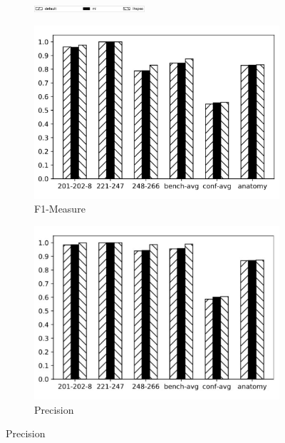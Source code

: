 \documentclass[twoside]{article}
\begin{document}
\begin{figure}[htb!]\centering
\begin{subfigure}{\textwidth}
	\centering
\includegraphics[width=0.45\textwidth]{figures/t_legend.pdf}
\end{subfigure}
\begin{subfigure}{0.3\textwidth}
	\centering
\includegraphics[width=\textwidth]{data_figs/MulRegress_Lily_F1.pdf}
\caption{F1-Measure}
\label{fig:MultiRegress_Lily_F1}
\end{subfigure}
\begin{subfigure}{0.3\textwidth}
	\centering
\includegraphics[width=\textwidth]{data_figs/MulRegress_Lily_P.pdf}
\caption{Precision}

\end{subfigure}
\end{figure}
\end{document}
